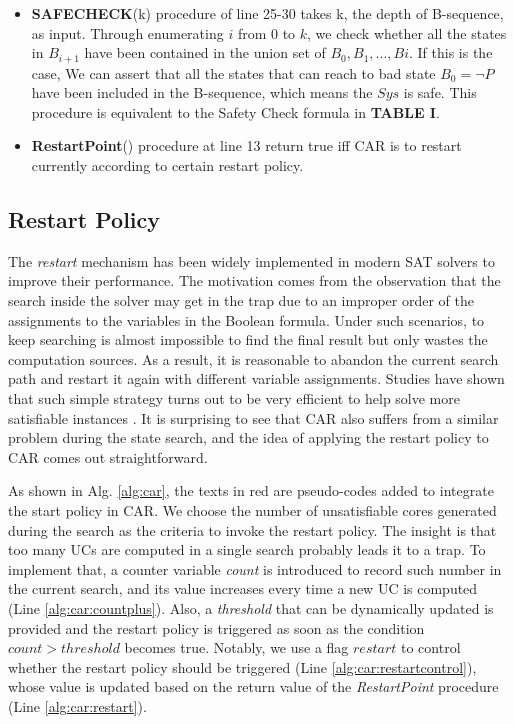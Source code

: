 \begin{itemize}
    \item \textbf{SAFECHECK}(k) procedure of line 25-30 takes k, the depth of B-sequence, as input. Through enumerating $i$ from $0$ to $k$, we check whether all the states in $B_{i+1}$ have been contained in the union set of $B_{0},B_{1},...,B{i}$. If this is the case, We can assert that all the states that can reach to bad state $B_{0}=\neg P$ have been included in the B-sequence, which means the $Sys$ is safe. This procedure is equivalent to the Safety Check formula in \textbf{TABLE I}.
    \item \textbf{RestartPoint}() procedure at line 13 return true iff CAR is to restart currently according to certain restart policy.
    \fi
\end{itemize}

\subsection{Restart Policy}

The \emph{restart} mechanism has been widely implemented in modern SAT solvers to improve their performance. The motivation comes from the observation that the search inside the solver may get in the trap due to an improper order of the assignments to the variables in the Boolean formula. Under such scenarios, to keep searching is almost impossible to find the final result  but only wastes the computation sources. As a result, it is reasonable to abandon the current search path and restart it again with different variable assignments. Studies have shown that such simple strategy turns out to be very efficient to help solve more satisfiable instances \cite{Biere08}. It is surprising to see that CAR also suffers from a similar problem during the state search, and the idea of applying the restart policy to CAR comes out straightforward.

As shown in Alg. \ref{alg:car}, the texts in red are pseudo-codes added to integrate the start policy in CAR. We choose the number of unsatisfiable cores generated during the search as the criteria to invoke the restart policy. The insight is that too many UCs are computed in a single search probably leads it to a trap. To implement that, a counter variable \emph{count} is introduced to record such number in the current search, and its value increases every time a new UC is computed (Line \ref{alg:car:countplus}). Also, a \emph{threshold} that can be dynamically updated is provided  and the restart policy is triggered as soon as the condition $count > threshold$ becomes true. Notably, we use a flag $restart$ to control whether the restart policy should be triggered (Line \ref{alg:car:restartcontrol}), whose value is updated based on the return value of the \emph{RestartPoint} procedure (Line \ref{alg:car:restart}).

